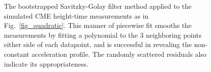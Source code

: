 \documentclass[referee]{aa}
\begin{document}
\begin{figure}[t]
\centering
{}
\caption{The bootstrapped Savitzky-Golay filter method applied to the simulated CME height-time measurements as in Fig.~\ref{fig_quadratic}. This manner of piecewise fit smooths the measurements by fitting a polynomial to the 3 neighboring points either side of each datapoint, and is successful in revealing the non-constant acceleration profile. The randomly scattered residuals also indicate its appropriateness.}
\label{fig_savgol}
\end{figure}
\end{document}
